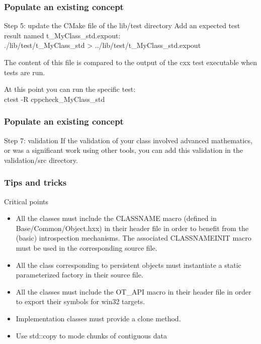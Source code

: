 \documentclass[8pt]{beamer}
\begin{document}
\begin{frame}
  \frametitle{Populate an existing concept}
  \begin{block}{Step 5: update the CMake file of the lib/test directory}
    Add an expected test result named t\_MyClass\_std.expout:\\
    {\ttfamily ./lib/test/t\_MyClass\_std > ../lib/test/t\_MyClass\_std.expout}
    
    The content of this file is compared to the output of the cxx test executable when tests are run.

    At this point you can run the specific test:\\
     {\ttfamily ctest -R cppcheck\_MyClass\_std}
  \end{block}
\end{frame}

\begin{frame}
  \frametitle{Populate an existing concept}
  \begin{block}{Step 7: validation}
    If the validation of your class involved advanced mathematics, or was a significant work using other tools, you can add this validation in the validation/src directory.

  \end{block}
\end{frame}
\begin{frame}
  \frametitle{Tips and tricks}
  \begin{block}{Critical points}
    \begin{itemize}
    \item All the classes must include the {\ttfamily CLASSNAME} macro (defined in Base/Common/Object.hxx) in their header file in order to benefit from the (basic) introspection mechanisms. The associated {\ttfamily CLASSNAMEINIT} macro must be used in the corresponding source file.
    \item All the class corresponding to persistent objects must instantiate a static parameterized factory in their source file.
        \item All the classes must include the {\ttfamily OT\_API} macro in their header file in order to export their symbols for win32 targets.
    \item Implementation classes must provide a clone method.
      \item Use std::copy to mode chunks of contiguous data
    \end{itemize}
  \end{block}
\end{frame}
\end{document}
